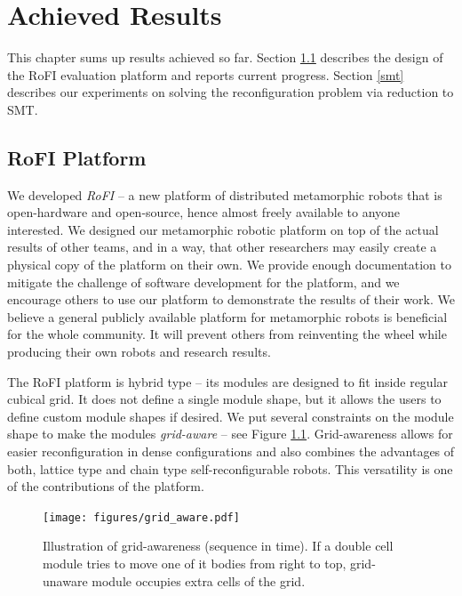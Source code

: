\chapter{Achieved Results}\label{chap:results}

This chapter sums up results achieved so far. Section \ref{platform} describes
the design of the RoFI evaluation platform and reports current progress. Section
\ref{smt} describes our experiments on solving the reconfiguration problem via
reduction to SMT.

\section{RoFI Platform}\label{platform}

We developed \emph{RoFI} -- a new platform of distributed metamorphic robots
that is open-hardware and open-source, hence almost freely available to anyone
interested. We designed our metamorphic robotic platform on top of the actual
results of other teams, and in a way, that other researchers may easily create a
physical copy of the platform on their own. We provide enough documentation to
mitigate the challenge of software development for the platform, and we
encourage others to use our platform to demonstrate the results of their work.
We believe a general publicly available platform for metamorphic robots is
beneficial for the whole community. It will prevent others from reinventing the
wheel while producing their own robots and research results.

The RoFI platform is hybrid type -- its modules are designed to fit inside
regular cubical grid. It does not define a single module shape, but it allows
the users to define custom module shapes if desired. We put several constraints
on the module shape to make the modules \emph{grid-aware} -- see Figure
\ref{fig:gridAware}. Grid-awareness allows for easier reconfiguration in dense
configurations and also combines the advantages of both, lattice type and chain
type self-reconfigurable robots. This versatility is one of the contributions of
the platform.

\begin{figure}[t]
    \centering
    \texttt{[image: figures/grid\_aware.pdf]}
    \caption{Illustration of grid-awareness (sequence in time). If
    a double cell module tries to move one of it bodies from right to top,
    grid-unaware module occupies extra cells of the grid.}
    \label{fig:gridAware}
\end{figure}

